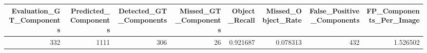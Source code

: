 \begin{tabular}{rrrrrrrr}
\toprule
Evaluation_GT_Components & Predicted_Components & Detected_GT_Components & Missed_GT_Components & Object_Recall & Missed_Object_Rate & False_Positive_Components & FP_Components_Per_Image \\
\midrule
332 & 1111 & 306 & 26 & 0.921687 & 0.078313 & 432 & 1.526502 \\
\bottomrule
\end{tabular}
